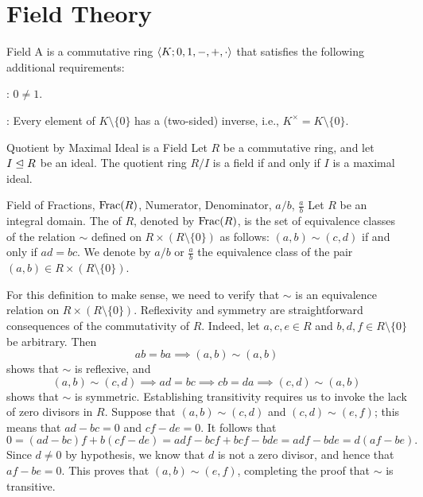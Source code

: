 
\chapter{Field Theory}

\begin{dfnbox}{Field}
	A  is a commutative ring ${\langle {K; 0, 1, -, +, \cdot} \rangle}$ that satisfies the following additional requirements:
	\begin{dfnitems}
		\item {}: $0 \ne 1$.
		\item {}: Every element of $K \setminus \{0\}$ has a (two-sided) inverse, i.e., $K^\times = K \setminus \{0\}$.
	\end{dfnitems}
\end{dfnbox}

\begin{thmbox}{Quotient by Maximal Ideal is a Field}
	Let $R$ be a commutative ring, and let $I \trianglelefteq R$ be an ideal. The quotient ring $R/I$ is a field if and only if $I$ is a maximal ideal.
\end{thmbox}

\begin{dfnbox}{Field of Fractions, $\operatorname{Frac}(R)$, Numerator, Denominator, $a/b$, $\frac{a}{b}$}
	Let $R$ be an integral domain. The  of $R$, denoted by $\operatorname{Frac}(R)$, is the set of equivalence classes of the relation $\sim$ defined on $R \times (R \setminus \{0\})$ as follows: $(a, b) \sim (c, d)$ if and only if $ad = bc$. We denote by $a/b$ or $\frac{a}{b}$ the equivalence class of the pair $(a, b) \in R \times (R \setminus \{0\})$.
\end{dfnbox}

For this definition to make sense, we need to verify that $\sim$ is an equivalence relation on $R \times (R \setminus \{0\})$. Reflexivity and symmetry are straightforward consequences of the commutativity of $R$. Indeed, let $a, c, e \in R$ and $b, d, f \in R \setminus \{0\}$ be arbitrary. Then
\[ ab = ba \implies (a, b) \sim (a, b) \]
shows that $\sim$ is reflexive, and
\[ (a, b) \sim (c, d) \implies ad = bc \implies cb = da \implies (c, d) \sim (a, b) \]
shows that $\sim$ is symmetric. Establishing transitivity requires us to invoke the lack of zero divisors in $R$. Suppose that $(a, b) \sim (c, d)$ and $(c, d) \sim (e, f)$; this means that $ad - bc = 0$ and $cf - de = 0$. It follows that
\[ 0 = (ad - bc)f + b(cf - de) = adf - bcf + bcf - bde = adf - bde = d(af - be). \]
Since $d \ne 0$ by hypothesis, we know that $d$ is not a zero divisor, and hence that $af - be = 0$. This proves that $(a, b) \sim (e, f)$, completing the proof that $\sim$ is transitive.

